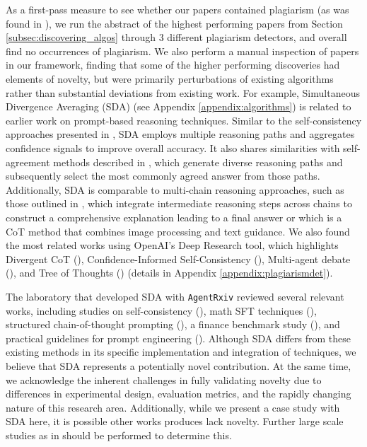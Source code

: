\documentclass[11pt, a4paper]{include/gdm_format}
\begin{document}
As a first-pass measure to see whether our papers contained plagiarism (as was found in \cite{gupta2025all}), we run the abstract of the highest performing papers from Section \ref{subsec:discovering_algos} through 3 different plagiarism detectors, and overall find no occurrences of plagiarism. We also perform a manual inspection of papers in our framework, finding that some of the higher performing discoveries had elements of novelty, but were primarily perturbations of existing algorithms rather than substantial deviations from existing work. For example, Simultaneous Divergence Averaging (SDA) (see Appendix \ref{appendix:algorithms}) is related to earlier work on prompt-based reasoning techniques. Similar to the self-consistency approaches presented in \cite{wang2023selfconsistency}, SDA employs multiple reasoning paths and aggregates confidence signals to improve overall accuracy. It also shares similarities with self-agreement methods described in \cite{lin2023just}, which generate diverse reasoning paths and subsequently select the most commonly agreed answer from those paths. Additionally, SDA is comparable to multi-chain reasoning approaches, such as those outlined in \cite{yoran2023answering}, which integrate intermediate reasoning steps across chains to construct a comprehensive explanation leading to a final answer or \cite{jia2024dcot} which is a CoT method that combines image processing and text guidance. We also found the most  related works using OpenAI's Deep Research tool, which highlights Divergent CoT (\cite{puerto2024fine}), Confidence-Informed Self-Consistency (\cite{taubenfeld2025confidence}), Multi-agent debate (\cite{liang2023encouraging}), and Tree of Thoughts (\cite{yao2024tree}) (details in Appendix \ref{appendix:plagiarismdet}).

The laboratory that developed SDA with \texttt{AgentRxiv} reviewed several relevant works, including studies on self-consistency (\cite{zhou2023solving}), math SFT techniques (\cite{liu2024acemath}), structured chain-of-thought prompting (\cite{li2023structuredchainofthoughtpromptingcode}), a finance benchmark study (\cite{zhao2023financemath}), and practical guidelines for prompt engineering (\cite{wang2024advanced}). Although SDA differs from these existing methods in its specific implementation and integration of techniques, we believe that SDA represents a potentially novel contribution. At the same time, we acknowledge the inherent challenges in fully validating novelty due to differences in experimental design, evaluation metrics, and the rapidly changing nature of this research area. Additionally, while we present a case study with SDA here, it is possible other works produces lack novelty. Further large scale studies as in \cite{gupta2025all} should be performed to determine this.
\end{document}
